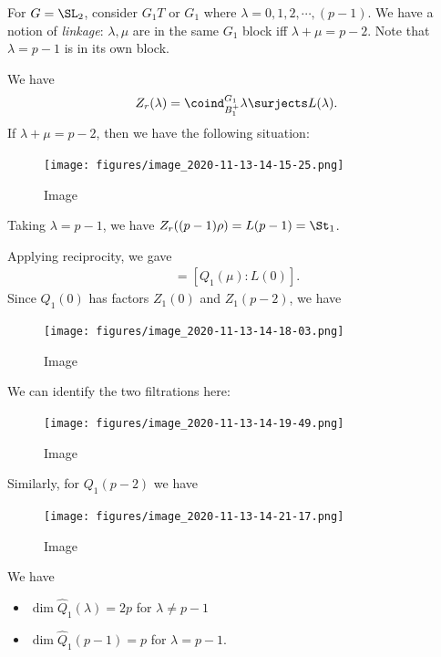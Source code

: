 \begin{example}[?]

For \(G = \SL_2\), consider \(G_1 T\) or \(G_1\) where
\(\lambda = 0,1,2,\cdots, (p-1)\). We have a notion of \emph{linkage}:
\(\lambda, \mu\) are in the same \(G_1\) block iff
\(\lambda + \mu = p-2\). Note that \(\lambda = p-1\) is in its own
block.

We have
\begin{align*}  
Z_r(\lambda) = \coind_{B_1^+}^{G_1} \lambda \surjects L(\lambda)
.\end{align*} If \(\lambda + \mu = p-2\), then we have the following
situation:

\begin{figure}
\centering
\texttt{[image: figures/image\_2020-11-13-14-15-25.png]}
\caption{Image}
\end{figure}

Taking \(\lambda = p-1\), we have \(Z_r((p-1)\rho) = L(p-1) = \St_1\).

Applying reciprocity, we gave
\begin{align*}  
[Q_1(0) : Q_1(\mu)] = [Q_1(\mu): L(0)]
.\end{align*} Since \(Q_1(0)\) has factors \(Z_1(0)\) and \(Z_1(p-2)\),
we have

\begin{figure}
\centering
\texttt{[image: figures/image\_2020-11-13-14-18-03.png]}
\caption{Image}
\end{figure}

We can identify the two filtrations here:

\begin{figure}
\centering
\texttt{[image: figures/image\_2020-11-13-14-19-49.png]}
\caption{Image}
\end{figure}

Similarly, for \(Q_1(p-2)\) we have

\begin{figure}
\centering
\texttt{[image: figures/image\_2020-11-13-14-21-17.png]}
\caption{Image}
\end{figure}

We have

\begin{itemize}
\item
  \(\dim \hat{Q}_1(\lambda) = 2p\) for \(\lambda \neq p-1\)
\item
  \(\dim \hat{Q}_1(p-1) = p\) for \(\lambda = p-1\).
\end{itemize}

\end{example}


